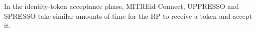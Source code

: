 In the identity-token acceptance phase, 
MITREid Connect,  UPPRESSO and SPRESSO take similar amounts of time for the RP to receive a token and accept it.

